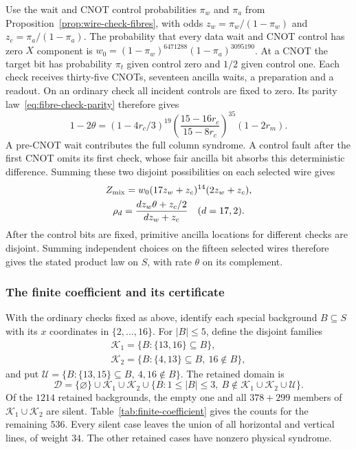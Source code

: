 \documentclass[10pt,twocolumn]{article}
\theoremstyle{definition}
\begin{document}
Use the wait and CNOT control probabilities $\pi_w$ and $\pi_a$
from Proposition~\ref{prop:wire-check-fibres}, with odds
$z_w=\pi_w/(1-\pi_w)$ and $z_c=\pi_a/(1-\pi_a)$.
The probability that every data wait and CNOT control has zero $X$
component is $w_0=(1-\pi_w)^{6471288}(1-\pi_a)^{3095190}$.
At a CNOT the target bit has probability $\pi_t$ given control zero
and $1/2$ given control one. Each check receives thirty-five CNOTs,
seventeen ancilla waits, a preparation and a readout. On an ordinary check all incident controls are fixed
to zero. Its parity law~\eqref{eq:fibre-check-parity} therefore gives
\begin{equation}\label{eq:finite-theta}
 1-2\theta=(1-4r_c/3)^{19}
 \left(\frac{15-16r_c}{15-8r_c}\right)^{35}(1-2r_m).
\end{equation}
A pre-CNOT wait contributes the full column syndrome. A control fault
after the first CNOT omits its first check, whose fair ancilla bit
absorbs this deterministic difference. Summing these two disjoint
possibilities on each selected wire gives
\begin{equation}\label{eq:finite-mixture}
\begin{gathered}
 Z_{\rm mix}=w_0(17z_w+z_c)^{14}(2z_w+z_c),\\
 \rho_d=\frac{d z_w\theta+z_c/2}{d z_w+z_c}\quad(d=17,2).
\end{gathered}
\end{equation}
After the control bits are fixed, primitive ancilla locations for
different checks are disjoint. Summing independent choices on the
fifteen selected wires therefore gives the stated product law on
$S$, with rate $\theta$ on its complement.

\subsubsection{The finite coefficient and its certificate}
With the ordinary checks fixed as above, identify each special
background $B\subseteq S$ with its $x$ coordinates in
$\{2,\ldots,16\}$. For $|B|\le5$, define the disjoint families
\[
\begin{gathered}
 \mathcal K_1=\{B:\{13,16\}\subseteq B\},\\
 \mathcal K_2=\{B:\{4,13\}\subseteq B,\ 16\notin B\},
\end{gathered}
\]
and put $\mathcal U=\{B:\{13,15\}\subseteq B,\ 4,16\notin B\}$.
The retained domain is
\[
 \mathcal D=\{\varnothing\}\cup\mathcal K_1\cup\mathcal K_2
 \cup\{B:1\le|B|\le3,\ B\notin
              \mathcal K_1\cup\mathcal K_2\cup\mathcal U\}.
\]
Of the $1214$ retained backgrounds, the empty one and all $378+299$
members of $\mathcal K_1\cup\mathcal K_2$ are silent.
Table~\ref{tab:finite-coefficient} gives the counts for the remaining
$536$. Every silent case leaves the union of all horizontal and
vertical lines, of weight $34$. The other retained cases have nonzero
physical syndrome.
\end{document}
